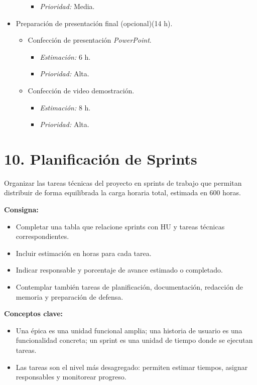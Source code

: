 \documentclass[
11pt, %
]{charter}
\begin{document}
\begin{itemize}
\begin{itemize}
\begin{itemize}
                    \item \textit{Prioridad:} Media.
                \end{itemize}
        \end{itemize} 
    \item Preparación de presentación final (opcional)(14 h).
        \begin{itemize}
            \item Confección de presentación \textit{PowerPoint}.
                \begin{itemize}
                    \item \textit{Estimación:} 6 h.
                    \item \textit{Prioridad:} Alta.
                \end{itemize}
            \item Confección de video demostración.
                \begin{itemize}
                    \item \textit{Estimación:} 8 h.
                    \item \textit{Prioridad:} Alta.
                \end{itemize}
        \end{itemize}
\end{itemize}

\section{10. Planificación de Sprints}

Organizar las tareas técnicas del proyecto en sprints de trabajo que permitan distribuir de forma equilibrada la carga horaria total, estimada en 600 horas.

\textbf{Consigna:}
\begin{itemize}
  \item Completar una tabla que relacione sprints con HU y tareas técnicas correspondientes.
  \item Incluir estimación en horas para cada tarea.
  \item Indicar responsable y porcentaje de avance estimado o completado.
  \item Contemplar también tareas de planificación, documentación, redacción de memoria y preparación de defensa.
\end{itemize}

\textbf{Conceptos clave:}
\begin{itemize}
  \item Una \'{e}pica es una unidad funcional amplia; una historia de usuario es una funcionalidad concreta; un sprint es una unidad de tiempo donde se ejecutan tareas.
  \item Las tareas son el nivel más desagregado: permiten estimar tiempos, asignar responsables y monitorear progreso.
\end{itemize}
\end{document}
